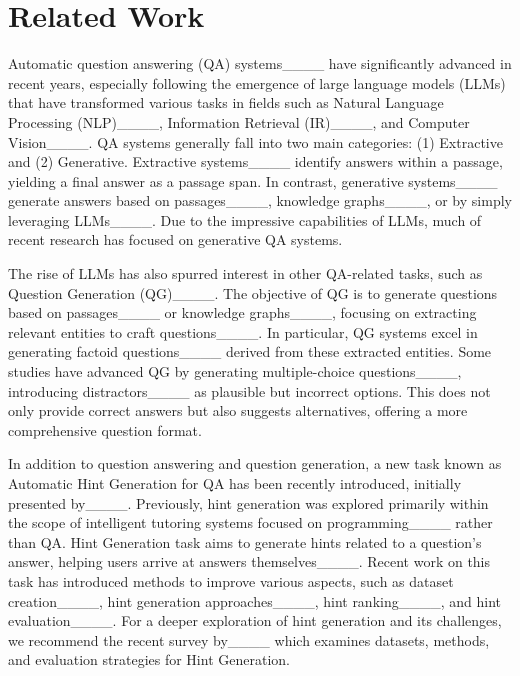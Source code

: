 \section{Related Work}
\label{s:related_work}
Automatic question answering (QA) systems____ have significantly advanced in recent years, especially following the emergence of large language models (LLMs) that have transformed various tasks in fields such as Natural Language Processing (NLP)____, Information Retrieval (IR)____, and Computer Vision____. QA systems generally fall into two main categories: (1) Extractive and (2) Generative. Extractive systems____ identify answers within a passage, yielding a final answer as a passage span. In contrast, generative systems____ generate answers based on passages____, knowledge graphs____, or by simply leveraging LLMs____. Due to the impressive capabilities of LLMs, much of recent research has focused on generative QA systems.

The rise of LLMs has also spurred interest in other QA-related tasks, such as Question Generation (QG)____. The objective of QG is to generate questions based on passages____ or knowledge graphs____, focusing on extracting relevant entities to craft questions____. In particular, QG systems excel in generating factoid questions____ derived from these extracted entities. Some studies have advanced QG by generating multiple-choice questions____, introducing distractors____ as plausible but incorrect options. This does not only provide correct answers but also suggests alternatives, offering a more comprehensive question format.

In addition to question answering and question generation, a new task known as Automatic Hint Generation for QA has been recently introduced, initially presented by____. Previously, hint generation was explored primarily within the scope of intelligent tutoring systems focused on programming____ rather than QA. Hint Generation task aims to generate hints related to a question’s answer, helping users arrive at answers themselves____. Recent work on this task has introduced methods to improve various aspects, such as dataset creation____, hint generation approaches____, hint ranking____, and hint evaluation____. For a deeper exploration of hint generation and its challenges, we recommend the recent survey by____ which examines datasets, methods, and evaluation strategies for Hint Generation.

